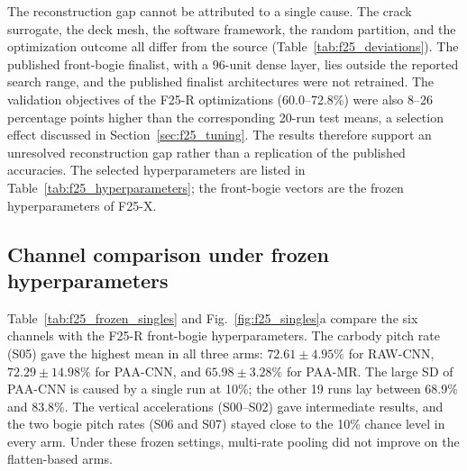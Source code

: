 The reconstruction gap cannot be attributed to a single cause. The crack
surrogate, the deck mesh, the software framework, the random partition, and
the optimization outcome all differ from the source
(Table~\ref{tab:f25_deviations}). The published front-bogie finalist, with a
96-unit dense layer, lies outside the reported search range, and the published
finalist architectures were not retrained. The validation objectives of the
F25-R optimizations (60.0--72.8\%) were also 8--26 percentage points higher
than the corresponding 20-run test means, a selection effect discussed in
Section~\ref{sec:f25_tuning}. The results therefore support an unresolved
reconstruction gap rather than a replication of the published accuracies.
The selected hyperparameters are listed in Table~\ref{tab:f25_hyperparameters};
the front-bogie vectors are the frozen hyperparameters of F25-X.

\begin{table}[htbp]
\centering
\caption{Hyperparameters selected by the 100-proposal searches for the F25-R
models and for the three tuned models on the carbody pitch rate (S05). Filters
are listed per convolutional layer; a superscript $p$ marks a layer followed by
max pooling.}
\label{tab:f25_hyperparameters}
\footnotesize
\setlength{\tabcolsep}{3pt}
\resizebox{\textwidth}{!}{}
\end{table}

\subsection{Channel comparison under frozen hyperparameters}

Table~\ref{tab:f25_frozen_singles} and Fig.~\ref{fig:f25_singles}a compare the
six channels with the F25-R front-bogie hyperparameters. The carbody pitch rate
(S05) gave the highest mean in all three arms: $72.61\pm4.95\%$ for RAW-CNN,
$72.29\pm14.98\%$ for PAA-CNN, and $65.98\pm3.28\%$ for PAA-MR. The large SD of
PAA-CNN is caused by a single run at 10\%; the other 19 runs lay between 68.9\%
and 83.8\%. The vertical accelerations (S00--S02) gave intermediate results,
and the two bogie pitch rates (S06 and S07) stayed close to the 10\% chance
level in every arm. Under these frozen settings, multi-rate pooling did not
improve on the flatten-based arms.

\begin{table}[htbp]
\centering
\caption{F25-X ten-class test accuracy with frozen hyperparameters (mean
$\pm$ sample SD over 20 runs, \%). All arms use the F25-R front-bogie
hyperparameters; PAA-MR uses the PAA-CNN vector with multi-rate pooling.}
\label{tab:f25_frozen_singles}
\footnotesize
\setlength{\tabcolsep}{4pt}
\resizebox{\textwidth}{!}{}
\end{table}

